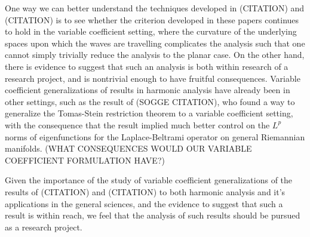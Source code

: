 \documentclass[12pt]{article}
\theoremstyle{plain}
\theoremstyle{remark}
\theoremstyle{definition}
\begin{document}
One way we can better understand the techniques developed in (CITATION) and (CITATION) is to see whether the criterion developed in these papers continues to hold in the variable coefficient setting, where the curvature of the underlying spaces upon which the waves are travelling complicates the analysis such that one cannot simply trivially reduce the analysis to the planar case. On the other hand, there is evidence to suggest that such an analysis is both within research of a research project, and is nontrivial enough to have fruitful consequences. Variable coefficient generalizations of results in harmonic analysis have already been in other settings, such as the result of (SOGGE CITATION), who found a way to generalize the Tomas-Stein restriction theorem to a variable coefficient setting, with the consequence that the result implied much better control on the $L^p$ norms of eigenfunctions for the Laplace-Beltrami operator on general Riemannian manifolds. (WHAT CONSEQUENCES WOULD OUR VARIABLE COEFFICIENT FORMULATION HAVE?)

Given the importance of the study of variable coefficient generalizations of the results of (CITATION) and (CITATION) to both harmonic analysis and it's applications in the general sciences, and the evidence to suggest that such a result is within reach, we feel that the analysis of such results should be pursued as a research project.


 
\end{document}
